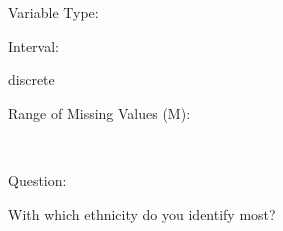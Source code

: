 \documentclass[
]{article}
\begin{document}
\begin{minipage}[t]{0.3\linewidth}

Variable Type:

\end{minipage}%
\begin{minipage}[t]{0.7\linewidth}

\end{minipage}

\begin{minipage}[t]{0.3\linewidth}

Interval:

\end{minipage}%
\begin{minipage}[t]{0.7\linewidth}

discrete

\end{minipage}

\begin{minipage}[t]{0.3\linewidth}

Range of Missing Values (M):

\end{minipage}%
\begin{minipage}[t]{0.7\linewidth}

~

\end{minipage}

\begin{minipage}[t]{0.3\linewidth}

Question:

\end{minipage}%
\begin{minipage}[t]{0.7\linewidth}

With which ethnicity do you identify most?

\end{minipage}
\end{document}
